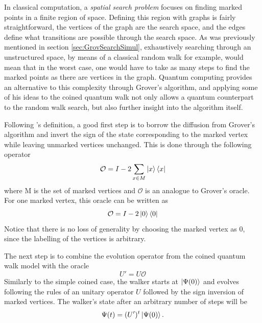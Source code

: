 \documentclass[../../dissertation.tex]{subfiles}
\begin{document}
In classical computation, a \textit{spatial search problem} focuses on finding
marked points in a finite region of space. Defining this region with graphs is
fairly straightforward, the vertices of the graph are the search space, and the
edges define what transitions are possible through the search space. As was
previously mentioned in section \ref{sec:GrovSearchSimul}, exhaustively
searching through an unstructured space, by means of a classical random walk
for example, would mean that in the worst case, one would have to take as many
steps to find the marked points as there are vertices in the graph. Quantum
computing provides an alternative to this complexity through Grover's
algorithm, and applying some of his ideas to the coined quantum walk not only
allows a quantum counterpart to the random walk search, but also further
insight into the algorithm itself.\par

Following \cite{REN1}'s definition, a good first step is to borrow the
diffusion from Grover's algorithm and invert the sign of the state
corresponding to the marked vertex while leaving unmarked vertices unchanged.
This is done through the following operator 
\begin{equation}
	\mathcal{O} = I - 2 \sum_{x\in M} \ket{x}\bra{x}
\end{equation}
where M is the set of marked vertices and $\mathcal{O}$ is an analogue to
Grover's oracle. For one marked vertex, this oracle can be written as 
\begin{equation}
	\mathcal{O} = I - 2 \ket{0}\bra{0}
\end{equation}
Notice that there is no loss of generality by choosing the marked vertex as
$0$, since the labelling of the vertices is arbitrary.\par 

The next step is to combine the evolution operator from the coined quantum walk
model with the oracle
\begin{equation}
	U'= U\mathcal{O}
	\label{eq:43}
\end{equation}
Similarly to the simple coined case, the walker starts at $\ket{\Psi(0)}$ and
evolves following the rules of an unitary operator $U$ followed by the sign
inversion of marked vertices. The walker's state after an arbitrary number of
steps will be
\begin{equation}
	\Psi(t) = (U')^t\ket{\Psi(0)}.
	\label{eq:sysStateSearch}
\end{equation}\par
\end{document}

